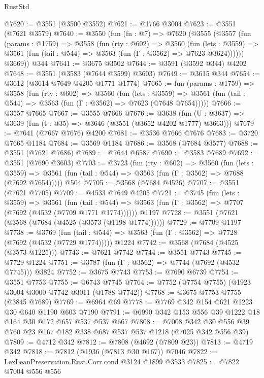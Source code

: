 \begin{lexlean}{RustStd}
\begin{coremodule}
@7620 := @3551 (@3500 @3552)
@7621 := @1766 @3004
@7623 := @3551 (@7621 @3579)
@7640 := @3550
    (fun (fn : @7) =>
    @7620
      (@3555
        (@3557
          (fun (params : @1759) =>
          @3558
            (fun (rty : @602) =>
            @3560
              (fun (lets : @3559) =>
              @3561 (fun (tail : @544) => @3563 (fun (Γ : @3562) => @7623 @3624))))))
        @3669))
    @344
@7641 := @3675 @3502
@7644 := @3591 (@3592 @344) @4202
@7648 := @3551 (@3583 (@7644 @3599) @3603)
@7649 := @3615 @344
@7654 := @3612 (@3614 @7649 @4205 @1771 @1774)
@7665 := fun (params : @1759) =>
  @3558
    (fun (rty : @602) =>
    @3560
      (fun (lets : @3559) =>
      @3561 (fun (tail : @544) => @3563 (fun (Γ : @3562) => @7623 (@7648 @7654)))))
@7666 := @3557 @7665
@7667 := @3555 @7666
@7676 := @3638 (fun (U : @3637) => @3639 (fun (t : @35) => @3646 (@3551 (@3652 @4202 @1777) @3663)))
@7679 := @7641 (@7667 @7676) @4200
@7681 := @3536 @7666 @7676
@7683 := @3720 @7665 @1184
@7684 := @3569 @1184
@7686 := @3568 (@7684 @3577)
@7688 := @3551 (@7621 @7686)
@7689 := @7644 @6587
@7690 := @3583 @7689
@7692 := @3551 (@7690 @3603)
@7703 := @3723
    (fun (rty : @602) =>
    @3560
      (fun (lets : @3559) =>
      @3561 (fun (tail : @544) => @3563 (fun (Γ : @3562) => @7688 (@7692 @7654)))))
    @504
@7705 := @3568 (@7684 @4526)
@7707 := @3551 (@7621 @7705)
@7709 := @4533 @7649 @4205
@7721 := @3745
    (fun (lets : @3559) =>
    @3561
      (fun (tail : @544) => @3563 (fun (Γ : @3562) => @7707 (@7692 (@4532 (@7709 @1771 @1774))))))
    @1197
@7728 := @3551 (@7621 (@3568 (@7684 (@4525 (@3573 (@1198 @1774))))))
@7729 := @7709 @1197
@7738 := @3769
    (fun (tail : @544) => @3563 (fun (Γ : @3562) => @7728 (@7692 (@4532 (@7729 @1774)))))
    @1224
@7742 := @3568 (@7684 (@4525 (@3573 @1225)))
@7743 := @7621 @7742
@7744 := @3551 @7743
@7745 := @7729 @1224
@7751 := @3787 (fun (Γ : @3562) => @7744 (@7692 (@4532 @7745))) @3824
@7752 := @3675 @7743
@7753 := @7690 @6739
@7754 := @3551 @7753
@7755 := @6743 @7745
@7764 := @7752 (@7754 @7755) (@1923 @3004 @3000 @7742 @3011 (@1788 @7742))
@7768 := @3675 @7753 @7755 (@3845 @7689)
@7769 := @6964 @69
@7778 := @7769 @342 @154 @621 @1223 @30 @640 @1190 @603 @7190
@7791 := @6990 @342 @153 @556 @39 @1222 @18 @164 @30 @172 @657 @537 @537 @667
@7808 := @7008 @342 @30 @556 @39 @760 @23 @167 @182 @338 @687 @537 @537 @1218 (@7025 @342 @556 @39)
@7809 := @4712 @342
@7812 := @7808 (@4692 (@7809 @23))
@7813 := @4719 @342
@7818 := @7812 (@1936 (@7813 @30 @167)) @7046
@7822 := LexLeanPreservation.Rust.Corr.cond @3124 @1899 @3533
@7825 := @7822 @7004 @556 @556

\end{coremodule}
\end{lexlean}
